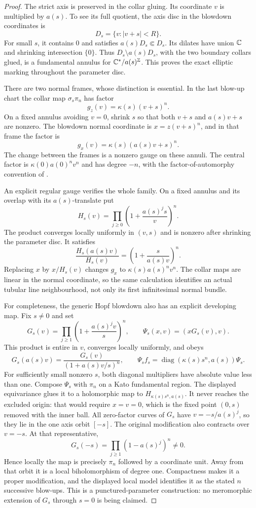 \begin{proof}
The strict axis is preserved in the collar gluing. Its coordinate
$v$ is multiplied by $a(s)$. To see its full quotient, the axis disc
in the blowdown coordinates is
\[
 D_s=\{v:|v+s|<R\}.
\]
For small $s$, it contains $0$ and satisfies $a(s)D_s\Subset D_s$.
Its dilates have union $\mathbb C$ and shrinking intersection $\{0\}$.
Thus $D_s\setminus a(s)D_s$, with the two boundary collars glued,
is a fundamental annulus for $\mathbb C^*/a(s)^\mathbb Z$.
This proves the exact elliptic marking throughout the parameter disc.

There are two normal frames, whose distinction is essential.
In the last blow-up chart the collar map $\sigma_s\pi_n$ has factor
\[
 g_z(v)=\kappa(s)(v+s)^n.
\]
On a fixed annulus avoiding $v=0$, shrink $s$ so that both
$v+s$ and $a(s)v+s$ are nonzero. The blowdown normal coordinate is
$x=z(v+s)^n$, and in that frame the factor is
\[
 g_x(v)=\kappa(s)(a(s)v+s)^n.
\]
The change between the frames is a nonzero gauge on these annuli.
The central factor is $\kappa(0)a(0)^n v^n$ and has degree $-n$,
with the factor-of-automorphy convention of
\citet[Proposition 5.6, pp.1369--1370]{IstratiEtAl2022Root}.

An explicit regular gauge verifies the whole family. On a fixed
annulus and its overlap with its $a(s)$-translate put
\[
 H_s(v)=\prod_{j\ge0}\left(1+\frac{a(s)^j s}{v}\right)^n.
\]
The product converges locally uniformly in $(v,s)$ and is nonzero
after shrinking the parameter disc. It satisfies
\[
 \frac{H_s(a(s)v)}{H_s(v)}
      =\left(1+\frac{s}{a(s)v}\right)^n.
\]
Replacing $x$ by $x/H_s(v)$ changes $g_x$ to
$\kappa(s)a(s)^n v^n$.
The collar maps are linear in the normal coordinate, so the same
calculation identifies an actual tubular line neighbourhood, not
only its first infinitesimal normal bundle.

For completeness, the generic Hopf blowdown also has an explicit
developing map. Fix $s\ne0$ and set
\[
 G_s(v)=\prod_{j\ge1}\left(1+\frac{a(s)^j v}{s}\right)^n,
       \qquad
 \Psi_s(x,v)=(xG_s(v),v).
\]
This product is entire in $v$, converges locally uniformly, and obeys
\[
 G_s(a(s)v)=\frac{G_s(v)}{(1+a(s)v/s)^n},\qquad
 \Psi_s f_s=\operatorname{diag}(\kappa(s)s^n,a(s))\Psi_s.
\]
For sufficiently small nonzero $s$, both diagonal multipliers have
absolute value less than one. Compose $\Psi_s$ with $\pi_n$ on a
Kato fundamental region. The displayed equivariance glues it to a
holomorphic map to $H_{\kappa(s)s^n,a(s)}$.
It never reaches the excluded origin: that would require
$x=v=0$, which is the fixed point $(0,s)$ removed with the inner ball.
All zero-factor curves of $G_s$ have
$v=-s/a(s)^j$, so they lie in the one axis orbit $[-s]$.
The original modification also contracts over $v=-s$.
At that representative,
\[
 G_s(-s)=\prod_{j\ge1}(1-a(s)^j)^n\ne0.
\]
Hence locally the map is precisely $\pi_n$ followed by a coordinate
unit. Away from that orbit it is a local biholomorphism of degree
one. Compactness makes it a proper modification, and the displayed
local model identifies it as the stated $n$ successive blow-ups.
This is a punctured-parameter construction: no meromorphic extension
of $G_s$ through $s=0$ is being claimed.


\end{proof}
